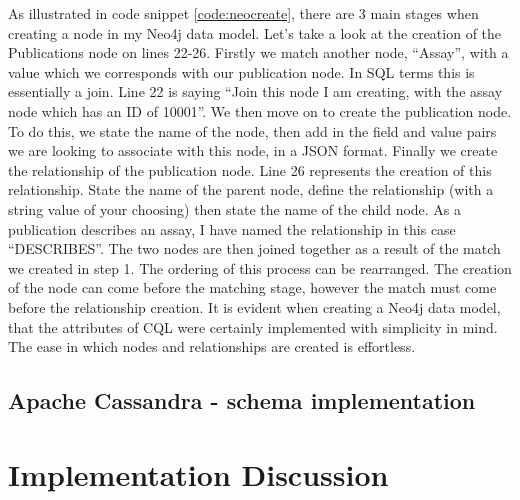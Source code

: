 As illustrated in code snippet \ref{code:neocreate}, there are 3 main stages when creating a node in my Neo4j data model. Let's take a look at the creation of the Publications node on lines 22-26. Firstly we match another node, ``Assay'', with a value which we corresponds with our publication node. In SQL terms this is essentially a join. Line 22 is saying ``Join this node I am creating, with the assay node which has an ID of 10001''. We then move on to create the publication node. To do this, we state the name of the node, then add in the field and value pairs we are looking to associate with this node, in a JSON format. Finally we create the relationship of the publication node. Line 26 represents the creation of this relationship. State the name of the parent node, define the relationship (with a string value of your choosing) then state the name of the child node. As a publication describes an assay, I have named the relationship in this case ``DESCRIBES''. The two nodes are then joined together as a result of the match we created in step 1. The ordering of this process can be rearranged. The creation of the node can come before the matching stage, however the match must come before the relationship creation. It is evident when creating a Neo4j data model, that the attributes of CQL were certainly implemented with simplicity in mind. The ease in which nodes and relationships are created is effortless.

\subsection{Apache Cassandra - schema implementation}

\section{Implementation Discussion}\label{schemadiscussion}


